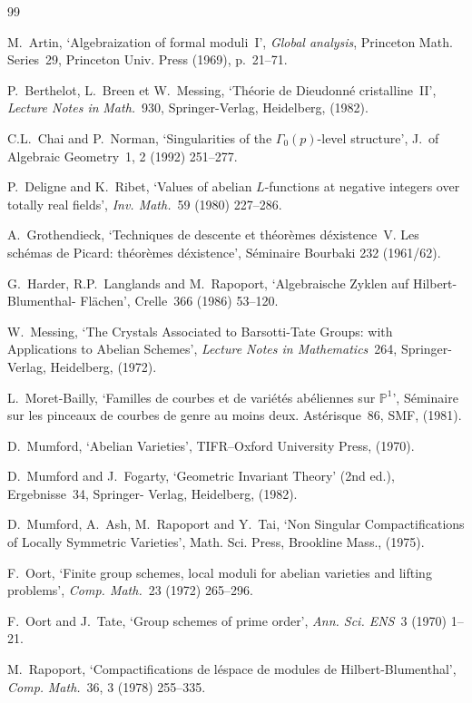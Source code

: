 \documentclass[11pt,a4paper]{article}
\theoremstyle{plain}
\theoremstyle{definition}
\begin{document}
\begin{thebibliography}{99}

M.~Artin, `Algebraization of formal moduli~I', \textit{Global analysis}, Princeton Math. Series~29,
Princeton Univ. Press (1969), p.~21--71.

P.~Berthelot, L.~Breen et W.~Messing, `Th\'eorie de Dieudonn\'e cristalline~II', \textit{Lecture Notes in}
\textit{Math.}~930, Springer-Verlag, Heidelberg, (1982).

C.L.~Chai and P.~Norman, `Singularities of the $\Gamma_0(p)$-level structure', J.~of Algebraic
Geometry~1, 2 (1992) 251--277.

P.~Deligne and K.~Ribet, `Values of abelian $L$-functions at negative integers over totally real
fields', \textit{Inv. Math.}~59 (1980) 227--286.

A.~Grothendieck, `Techniques de descente et th\'eor\`emes d\'existence~V. Les sch\'emas de
Picard: th\'eor\`emes d\'existence', S\'eminaire Bourbaki 232 (1961/62).

G.~Harder, R.P.~Langlands and M.~Rapoport, `Algebraische Zyklen auf Hilbert-Blumenthal-
Fl\"achen', Crelle~366 (1986) 53--120.

W.~Messing, `The Crystals Associated to Barsotti-Tate Groups: with Applications to
Abelian Schemes', \textit{Lecture Notes in Mathematics}~264, Springer-Verlag, Heidelberg, (1972).

L.~Moret-Bailly, `Familles de courbes et de vari\'et\'es ab\'eliennes sur $\mathbb{P}^1$', S\'eminaire sur les
pinceaux de courbes de genre au moins deux. Ast\'erisque~86, SMF, (1981).

D.~Mumford, `Abelian Varieties', TIFR--Oxford University Press, (1970).

D.~Mumford and J.~Fogarty, `Geometric Invariant Theory' (2nd ed.), Ergebnisse~34, Springer-
Verlag, Heidelberg, (1982).

D.~Mumford, A.~Ash, M.~Rapoport and Y.~Tai, `Non Singular Compactifications of Locally
Symmetric Varieties', Math. Sci. Press, Brookline Mass., (1975).

F.~Oort, `Finite group schemes, local moduli for abelian varieties and lifting problems',
\textit{Comp. Math.}~23 (1972) 265--296.

F.~Oort and J.~Tate, `Group schemes of prime order', \textit{Ann. Sci. ENS}~3 (1970) 1--21.

M.~Rapoport, `Compactifications de l\'espace de modules de Hilbert-Blumenthal', \textit{Comp.}
\textit{Math.}~36, 3 (1978) 255--335.

\end{thebibliography}
\end{document}
